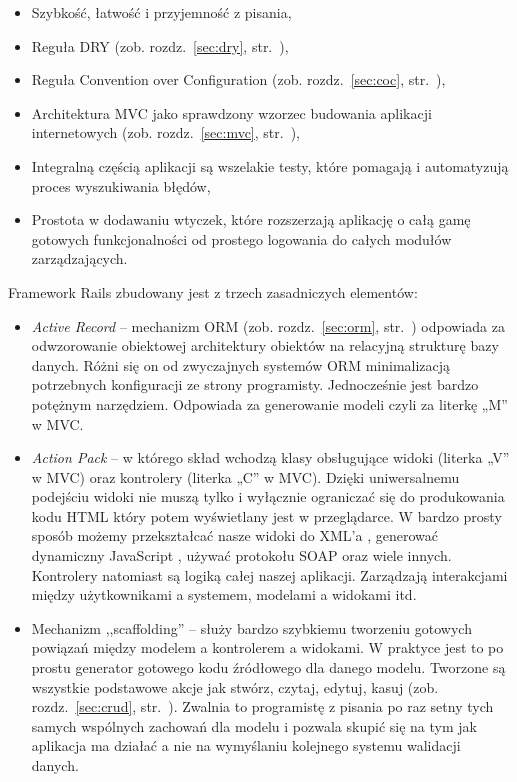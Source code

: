 \documentclass[a4paper,12pt,oneside]{report}
\begin{document}
\begin{itemize}
  \item Szybkość, łatwość i przyjemność z pisania,
  \item Reguła DRY (zob. rozdz.~\ref{sec:dry}, str.~\pageref{sec:dry}),
  \item Reguła Convention over Configuration (zob. rozdz.~\ref{sec:coc}, str.~\pageref{sec:coc}),
  \item Architektura MVC jako sprawdzony wzorzec budowania aplikacji internetowych (zob. rozdz.~\ref{sec:mvc}, str.~\pageref{sec:mvc}),
  \item Integralną częścią aplikacji są wszelakie testy, które pomagają i automatyzują proces wyszukiwania błędów,
  \item Prostota w dodawaniu wtyczek, które rozszerzają aplikację o całą gamę gotowych funkcjonalności od prostego logowania do całych modułów zarządzających.
\end{itemize}

Framework Rails zbudowany jest z trzech zasadniczych elementów:

\begin{itemize}
\item \emph{Active Record} -- mechanizm ORM (zob. rozdz.~\ref{sec:orm}, str.~\pageref{sec:orm}) odpowiada za odwzorowanie obiektowej architektury obiektów na relacyjną strukturę bazy danych. Różni się on od zwyczajnych systemów ORM minimalizacją potrzebnych konfiguracji ze strony programisty. Jednocześnie jest bardzo potężnym narzędziem. Odpowiada za generowanie modeli czyli za literkę „M” w MVC.
\item \emph{Action Pack} -- w którego skład wchodzą klasy obsługujące widoki (literka „V” w MVC) oraz kontrolery (literka „C” w MVC). Dzięki uniwersalnemu podejściu widoki nie muszą tylko i wyłącznie ograniczać się do produkowania kodu HTML który potem wyświetlany jest w przeglądarce. W bardzo prosty sposób możemy przekształcać nasze widoki do XML’a , generować dynamiczny JavaScript , używać protokołu SOAP oraz wiele innych. Kontrolery natomiast są logiką całej naszej aplikacji. Zarządzają interakcjami między użytkownikami a systemem, modelami a widokami itd.
\item Mechanizm ,,scaffolding'' -- służy bardzo szybkiemu tworzeniu gotowych powiązań między modelem a kontrolerem a widokami. W praktyce jest to po prostu generator gotowego kodu źródłowego dla danego modelu. Tworzone są wszystkie podstawowe akcje jak stwórz, czytaj, edytuj, kasuj (zob. rozdz.~\ref{sec:crud}, str.~\pageref{sec:crud}). Zwalnia to programistę z pisania po raz setny tych samych wspólnych zachowań dla modelu i pozwala skupić się na tym jak aplikacja ma działać a nie na wymyślaniu kolejnego systemu walidacji danych.
\end{itemize}
\end{document}
